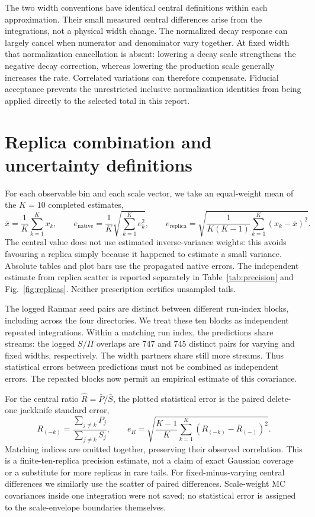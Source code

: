 \documentclass[11pt,a4paper]{article}
\begin{document}
The two width conventions have identical central definitions within
each approximation. Their small measured central differences arise
from the integrations, not a physical width change. The normalized
decay response can largely cancel when numerator and denominator vary
together. At fixed width that normalization cancellation is absent:
lowering a decay scale strengthens the negative decay correction,
whereas lowering the production scale generally increases the rate.
Correlated variations can therefore compensate. Fiducial acceptance
prevents the unrestricted inclusive normalization identities from being
applied directly to the selected total in this report.

\section{Replica combination and uncertainty definitions}
For each observable bin and each scale vector, we take an equal-weight
mean of the $K=10$ completed estimates,
\begin{equation}
 \bar x=\frac1K\sum_{k=1}^K x_k,\qquad
 e_{\mathrm{native}}=\frac1K\sqrt{\sum_{k=1}^K e_k^2},\qquad
 e_{\mathrm{replica}}=
 \sqrt{\frac{1}{K(K-1)}\sum_{k=1}^K(x_k-\bar x)^2}.
\end{equation}
The central value does not use estimated inverse-variance weights:
this avoids favouring a replica simply because it happened to estimate
a small variance. Absolute tables and plot bars use the propagated
native errors. The independent estimate from replica scatter is
reported separately in Table~\ref{tab:precision} and
Fig.~\ref{fig:replicas}. Neither prescription certifies unsampled tails.

The logged Ranmar seed pairs are distinct between different run-index
blocks, including across the four directories. We treat these ten
blocks as independent repeated integrations. Within a matching run
index, the predictions share streams: the logged $S/\Pi$ overlaps are
747 and 745 distinct pairs for varying and fixed widths, respectively.
The width partners share still more streams. Thus statistical errors
between predictions must not be combined as independent errors.
The repeated blocks now permit an empirical estimate of this covariance.

For the central ratio $\widehat R=\bar P/\bar S$, the plotted statistical
error is the paired delete-one jackknife standard error,
\begin{equation}
 R_{(-k)}=\frac{\sum_{j\ne k}P_j}{\sum_{j\ne k}S_j},\qquad
 e_R=\sqrt{\frac{K-1}{K}
 \sum_{k=1}^K\left(R_{(-k)}-\overline R_{(-)}\right)^2}.
\end{equation}
Matching indices are omitted together, preserving their observed
correlation. This is a finite-ten-replica precision estimate, not a
claim of exact Gaussian coverage or a substitute for more replicas in
rare tails. For fixed-minus-varying central differences we similarly
use the scatter of paired differences. Scale-weight MC covariances
inside one integration were not saved; no statistical error is assigned
to the scale-envelope boundaries themselves.
\end{document}
